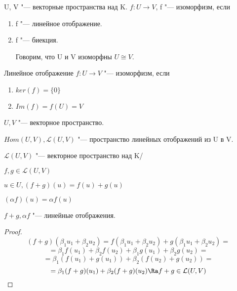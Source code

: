 \begin{Def}
U, V "--- векторные пространства над K.
$f \colon U \to V$, f "--- изоморфизм, если
\begin{enumerate}
\item f "--- линейное отображение.
\item f "--- биекция. 

Говорим, что U и V изоморфны $U \cong V$.
\end{enumerate}
\end{Def}

\begin{Rem}
Линейное отображение $f:U \to V$ "--- изоморфизм, если 
\begin{enumerate}
\item $ker(f) = \{0\}$
\item $Im(f) = f(U) = V$
\end{enumerate}
\end{Rem}

\begin{Def}
$U, V$ "--- векторное пространство.

$Hom(U, V), \mathcal{L}(U, V)$ "--- пространство линейных отображений из U в V.
\end{Def}

\begin{theorem}
$\mathcal{L}(U, V)$ "--- векторное пространство над K/

$f, g \in \mathcal{L}(U, V)$

$u \in U, (f + g)(u) = f(u) + g(u)$

$(\alpha f)(u) = \alpha f(u)$

$f + g, \alpha f$ "--- линейные отображения.
\end{theorem}

\begin{proof}
$$(f + g)(\beta_{1}u_{1} + \beta_2u_{2}) = f(\beta_1 u_1 + \beta_{2}u_{2})+
g(\beta_1u_1 + \beta_2u_2) =$$
$$=\beta_1f(u_1) + \beta_2f(u_2) + \beta_1g(u_1) + \beta_2g(u_2) = $$
$$=\beta_1(f(u_1) + g(u_1)) + \beta_{2}(f(u_2) + g(u_2)) =$$
$$=\beta_1(f + g)(u_1) + \beta_2(f + g)(u_2) \Ra f + g \in \mathcal{L}(U, V)$$
\end{proof}

